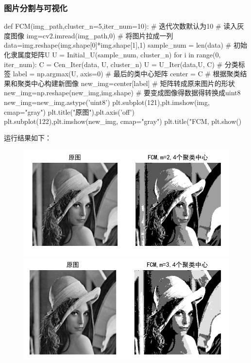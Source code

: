 \documentclass{article}
\begin{document}
\subsubsection{图片分割与可视化}
\begin{python}
	def FCM(img_path,cluster_n=5,iter_num=10): # 迭代次数默认为10
		 # 读入灰度图像
		 img=cv2.imread(img_path,0)
		 # 将图片拉成一列
		 data=img.reshape(img.shape[0]*img.shape[1],1)
		 sample_num = len(data)
		 # 初始化隶属度矩阵U
	 	 U = Initial_U(sample_num, cluster_n)
		 for i in range(0, iter_num):
		 	 C = Cen_Iter(data, U, cluster_n)
		 	 U = U_Iter(data,U, C)	 	 
		 # 分类标签
		 label = np.argmax(U, axis=0)
		 # 最后的类中心矩阵
		 center = C
		 # 根据聚类结果和聚类中心构建新图像
		 new_img=center[label]
		 # 矩阵转成原来图片的形状
		 new_img=np.reshape(new_img,img.shape)
		 # 要变成图像得数据得转换成uint8
		 new_img=new_img.astype('uint8')
		 plt.subplot(121),plt.imshow(img, cmap="gray")
		 plt.title("原图"),plt.axis('off')
		 plt.subplot(122),plt.imshow(new_img, cmap="gray")
		 plt.title("FCM,%
		 plt.show()
\end{python}	
运行结果如下：
\begin{figure}[H]  
	\centering
	\includegraphics[scale=1]{1.png}
	\includegraphics[scale=1]{2.png}
\end{figure}	
\end{document}
